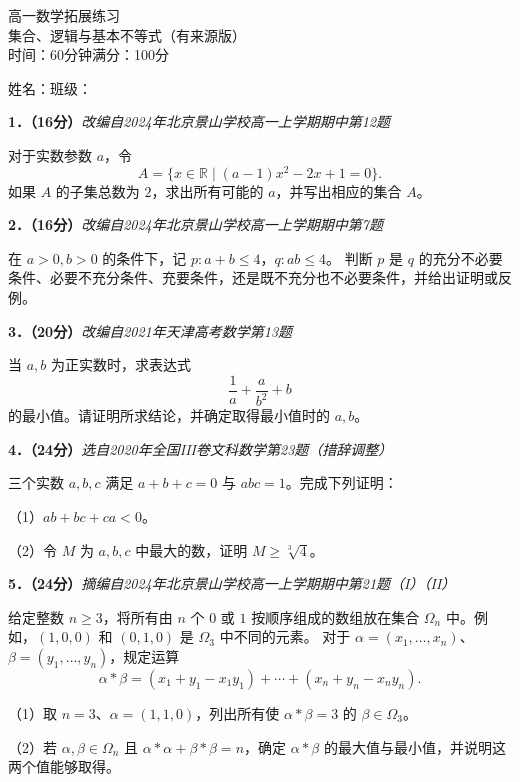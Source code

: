 \documentclass[UTF8,a4paper,12pt]{ctexart}
\newcommand{\subq}[1]{\par\Needspace{3\baselineskip}（#1）}
\newcommand{\src}[1]{{\small\textit{#1}}\par}
\begin{document}
\begin{center}{\LARGE 高一数学拓展练习}\\[5pt]集合、逻辑与基本不等式（有来源版）\\[4pt]时间：60分钟\qquad 满分：100分\end{center}
姓名：\underline{\hspace{3cm}}\qquad 班级：\underline{\hspace{3cm}}

\textbf{1．（16分）}\src{改编自2024年北京景山学校高一上学期期中第12题}
对于实数参数 $a$，令
\[A=\{x\in\mathbb R\mid (a-1)x^2-2x+1=0\}.\]
如果 $A$ 的子集总数为 $2$，求出所有可能的 $a$，并写出相应的集合 $A$。
\par\vspace*{2.4cm}

\textbf{2．（16分）}\src{改编自2024年北京景山学校高一上学期期中第7题}
在 $a>0,b>0$ 的条件下，记 $p:a+b\le4$，$q:ab\le4$。
判断 $p$ 是 $q$ 的充分不必要条件、必要不充分条件、充要条件，还是既不充分也不必要条件，并给出证明或反例。
\par\vspace*{2.4cm}

\textbf{3．（20分）}\src{改编自2021年天津高考数学第13题}
当 $a,b$ 为正实数时，求表达式
\[\frac1a+\frac{a}{b^2}+b\]
的最小值。请证明所求结论，并确定取得最小值时的 $a,b$。
\par\vspace*{2.4cm}
\newpage
\textbf{4．（24分）}\src{选自2020年全国III卷文科数学第23题（措辞调整）}
三个实数 $a,b,c$ 满足 $a+b+c=0$ 与 $abc=1$。完成下列证明：
\subq{1}$ab+bc+ca<0$。
\subq{2}令 $M$ 为 $a,b,c$ 中最大的数，证明 $M\ge\sqrt[3]{4}$。
\par\vspace*{4cm}

\textbf{5．（24分）}\src{摘编自2024年北京景山学校高一上学期期中第21题（I）（II）}
给定整数 $n\ge3$，将所有由 $n$ 个 $0$ 或 $1$ 按顺序组成的数组放在集合 $\Omega_n$ 中。例如，$(1,0,0)$ 和 $(0,1,0)$ 是 $\Omega_3$ 中不同的元素。
对于 $\alpha=(x_1,\ldots,x_n)$、$\beta=(y_1,\ldots,y_n)$，规定运算
\[\alpha*\beta=(x_1+y_1-x_1y_1)+\cdots+(x_n+y_n-x_ny_n).\]
\subq{1}取 $n=3$、$\alpha=(1,1,0)$，列出所有使 $\alpha*\beta=3$ 的 $\beta\in\Omega_3$。
\subq{2}若 $\alpha,\beta\in\Omega_n$ 且 $\alpha*\alpha+\beta*\beta=n$，确定 $\alpha*\beta$ 的最大值与最小值，并说明这两个值能够取得。
\par\vspace*{4cm}
\end{document}
